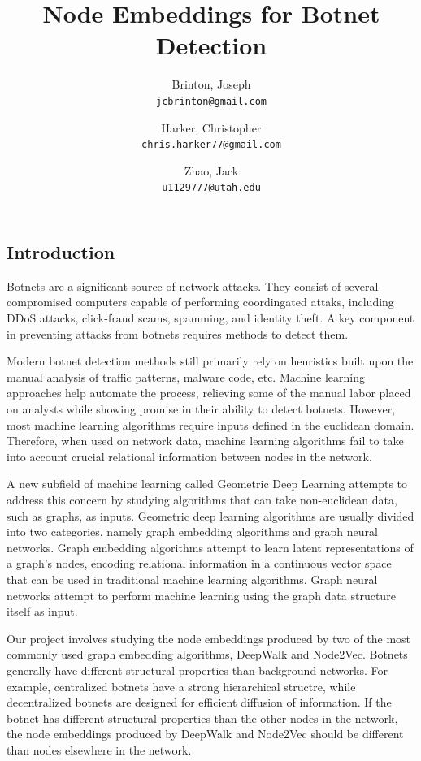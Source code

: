 \documentclass[10pt]{article}
\title{Node Embeddings for Botnet Detection}
\author{
	Brinton, Joseph\\
	\texttt{jcbrinton@gmail.com}
	\and
	Harker, Christopher\\
	\texttt{chris.harker77@gmail.com}
	\and
	Zhao, Jack\\
	\texttt{u1129777@utah.edu}
}
\begin{document}
\maketitle

\begin{multicols}{2}

\section{Introduction}

Botnets are a significant source of network attacks. They consist of several compromised computers capable of performing coordingated attaks, including DDoS attacks, click-fraud scams, spamming, and identity theft. A key component in preventing attacks from botnets requires methods to detect them.

Modern botnet detection methods still primarily rely on heuristics built upon the manual analysis of traffic patterns, malware code, etc. Machine learning approaches help automate the process, relieving some of the manual labor placed on analysts while showing promise in their ability to detect botnets. However, most machine learning algorithms require inputs defined in the euclidean domain. Therefore, when used on network data, machine learning algorithms fail to take into account crucial relational information between nodes in the network. 

A new subfield of machine learning called Geometric Deep Learning attempts to address this concern by studying algorithms that can take non-euclidean data, such as graphs, as inputs. Geometric deep learning algorithms are usually divided into two categories, namely graph embedding algorithms and graph neural networks. Graph embedding algorithms attempt to learn latent representations of a graph's nodes, encoding relational information in a continuous vector space that can be used in traditional machine learning algorithms. Graph neural networks attempt to perform machine learning using the graph data structure itself as input. 

Our project involves studying the node embeddings produced by two of the most commonly used graph embedding algorithms, DeepWalk and Node2Vec. Botnets generally have different structural properties than background networks. For example, centralized botnets have a strong hierarchical structre, while decentralized botnets are designed for efficient diffusion of information. If the botnet has different structural properties than the other nodes in the network, the node embeddings produced by DeepWalk and Node2Vec should be different than nodes elsewhere in the network. 


\end{multicols}
\end{document}
